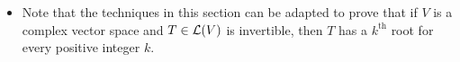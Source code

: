 \documentclass[../main.tex]{subfiles}
\begin{document}
\begin{itemize}
\begin{theorem}
\begin{proof}
            \begin{equation*}
                Rv = R_1u_1+\cdots+R_mu_m
            \end{equation*}\par
            To prove that $R^2=T$, it will suffice to show that $R^2v=Tv$ for all $v\in V$. Let $v\in V$ be arbitrary. Then it follows from all of our definitions that
            \begin{align*}
                R^2v &= R_1^2u_1+\cdots+R_m^2u_m\\
                &= \lambda_1\left( I+\frac{N_1}{\lambda_1} \right)u_1+\cdots+\lambda_m\left( I+\frac{N_m}{\lambda_m} \right)u_m\\
                &= T|_{G(\lambda_1,T)}u_1+\cdots+T|_{G(\lambda_m,T)}u_m\\
                &= Tu_1+\cdots+Tu_m\\
                &= Tv
            \end{align*}
            as desired.
        \end{proof}
    \end{theorem}
    \item Note that the techniques in this section can be adapted to prove that if $V$ is a complex vector space and $T\in\mathcal{L}(V)$ is invertible, then $T$ has a $k^\text{th}$ root for every positive integer $k$.
\end{itemize}
\end{document}
